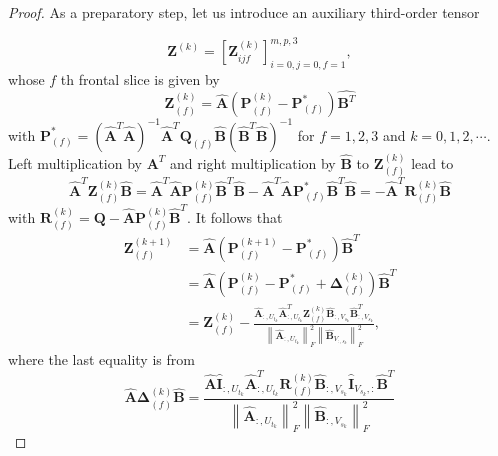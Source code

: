\documentclass[11pt]{article}
\numberwithin{equation}{section}
\begin{document}
\begin{proof}
As a preparatory step, let us introduce an auxiliary third-order tensor

$$
\boldsymbol{Z}^{(k)}=\left[\boldsymbol{Z}_{i j f}^{(k)}\right]_{i=0, j=0, f=1}^{m, p, 3},
$$
whose $f$ th frontal slice is given by
$$
\boldsymbol{Z}_{(f)}^{(k)}=\hat{\boldsymbol{A}}\left(\boldsymbol{P}_{(f)}^{(k)}-\boldsymbol{P}_{(f)}^{*}\right) \hat{\boldsymbol{B}^T}
$$
with $\boldsymbol{P}_{(f)}^{*}=\left(\hat{\boldsymbol{A}}^{T} \hat{\boldsymbol{A}}\right)^{-1} \hat{\boldsymbol{A}}^{T} \boldsymbol{Q}_{(f)} \hat{\boldsymbol{B}}\left(\hat{\boldsymbol{B}}^{T} \hat{\boldsymbol{B}}\right)^{-1}$ for $f=1,2,3$ and $k=0,1,2, \cdots$. Left multiplication by $\boldsymbol{A}^{T}$ and right multiplication by $\hat{\boldsymbol{B}}$ to $\boldsymbol{Z}_{(f)}^{(k)}$ lead to
$$
\hat{\boldsymbol{A}}^{T} \boldsymbol{Z}_{(f)}^{(k)} \hat{\boldsymbol{B}}=\hat{\boldsymbol{A}}^{T} \hat{\boldsymbol{A}} \boldsymbol{P}_{(f)}^{(k)} \hat{\boldsymbol{B}}^{T} \hat{\boldsymbol{B}}-\hat{\boldsymbol{A}}^{T} \hat{\boldsymbol{A}} \boldsymbol{P}_{(f)}^{*} \hat{\boldsymbol{B}}^{T} \hat{\boldsymbol{B}}=-\hat{\boldsymbol{A}}^{T} \boldsymbol{R}_{(f)}^{(k)} \hat{\boldsymbol{B}}
$$
with $\boldsymbol{R}_{(f)}^{(k)}=\boldsymbol{Q}-\hat{\boldsymbol{A}} \boldsymbol{P}_{(f)}^{(k)} \hat{\boldsymbol{B}}^T$. It follows that
$$
\begin{aligned}
\boldsymbol{Z}_{(f)}^{(k+1)} & =\hat{\boldsymbol{A}}\left(\boldsymbol{P}_{(f)}^{(k+1)}-\boldsymbol{P}_{(f)}^{*}\right) \hat{\boldsymbol{B}}^T \\
& =\hat{\boldsymbol{A}}\left(\boldsymbol{P}_{(f)}^{(k)}-\boldsymbol{P}_{(f)}^{*}+\boldsymbol{\Delta}_{(f)}^{(k)}\right) \hat{\boldsymbol{B}}^T \\
& =\boldsymbol{Z}_{(f)}^{(k)}-\frac{\hat{\boldsymbol{A}}_{:, U_{t_{k}}} \hat{\boldsymbol{A}}_{:, U_{t_{k}}}^{T} \boldsymbol{Z}_{(f)}^{(k)} \hat{\boldsymbol{B}}_{:,V_{s_{k}}} \hat{\boldsymbol{B}}_{:,V_{s_{k}}}^{T}}{\left\|\hat{\boldsymbol{A}}_{:, U_{t_{k}}}\right\|_{F}^{2}\left\|\hat{\boldsymbol{B}}_{V_{:,s_{k}}}\right\|_{F}^{2}},
\end{aligned}
$$
where the last equality is from
$$
\hat{\boldsymbol{A}} \boldsymbol{\Delta}_{(f)}^{(k)} \hat{\boldsymbol{B}}=\frac{\hat{\boldsymbol{A}} \widehat{\boldsymbol{I}}_{:, U_{t_{k}}} \hat{\boldsymbol{A}}_{:, U_{t_{k}}}^{T} \boldsymbol{R}_{(f)}^{(k)} \hat{\boldsymbol{B}}_{:,V_{s_{k}}}\widehat{\boldsymbol{I}}_{V_{s_{k}},:} \hat{\boldsymbol{B}}^{T}}{\left\|\hat{\boldsymbol{A}}_{:, U_{t_{k}}}\right\|_{F}^{2}\left\|\hat{\boldsymbol{B}}_{:,V_{s_{k}}}\right\|_{F}^{2}}
$$
\end{proof}
\end{document}
